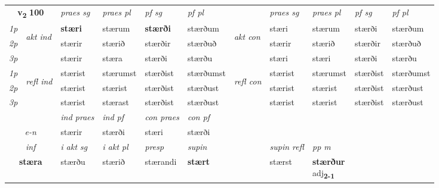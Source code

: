 \noindent
\begin{tabular}{lllllllllll} \toprule
\multicolumn{2}{c}{\textbf{v{\textsubscript{2}}} \Large{\textbf{100}}}  &  \textit{praes sg}  & \textit{praes pl}  &\textit{ pf sg} & \textit{pf pl} &  &  \textit{praes sg}  & \textit{praes pl}  & \textit{pf sg} & \textit{pf pl } \\*
	\cmidrule{3-6} \cmidrule{8-11}
 {\textit{1p}} & \multirow{3}{*}{\begin{turn}{90}\textit{akt ind}\end{turn}} & \textbf{stæri} & stærum & \textbf{stærði} & stærðum & \multirow{3}{*}{\begin{turn}{90}\textit{akt con}\end{turn}} &stæri & stærum & stærði & stærðum\\*
 {\textit{2p}} &  &  stærir  & stærið & stærðir & stærðuð & & stærir & stærið & stærðir & stærðuð \\*
{\textit{3p}} &  & stærir & stæra & stærði & stærðu & & stæri & stæri& stærði & stærðu \\*
\cmidrule{3-6} \cmidrule{8-11}
 {\textit{1p}} & \multirow{3}{*}{\begin{turn}{90}\textit{refl ind}\end{turn}}  & stærist & stærumst & stærðist & stærðumst & \multirow{3}{*}{\begin{turn}{90}\textit{refl con}\end{turn}}  &stærist & stærumst & stærðist & stærðumst \\*
 {\textit{2p}} &  & stærist & stærist & stærðist & stærðust & &stærist & stærist & stærðist & stærðust \\*
 {\textit{3p}}  & & stærist & stærast & stærðist & stærðust & & stærist & stærist& stærðist & stærðust \\*
\cmidrule{3-6} \cmidrule{8-11}

   & &  \textit{ind praes} & \textit{ind pf} & \textit{con praes} & \textit{con pf} \\*
\multicolumn{2}{c}{ \textit{e-n} } & stærir & stærði & stæri & stærði \\*

\cmidrule{3-9}
   \multicolumn{2}{c}{\textit{inf}}  & \textit{i akt sg} & \textit{i akt pl}   & \textit{presp} & \textit{supin} && \textit{supin refl} & \textit{pp m} \\*
  \multicolumn{2}{c}{\textbf{stæra}} & stærðu  & stærið   & stærandi &  \textbf{stært} && stærst & \specialcell{\textbf{stærður} \\ adj\textbf{\textsubscript{2-1}}} \\*
\end{tabular}


